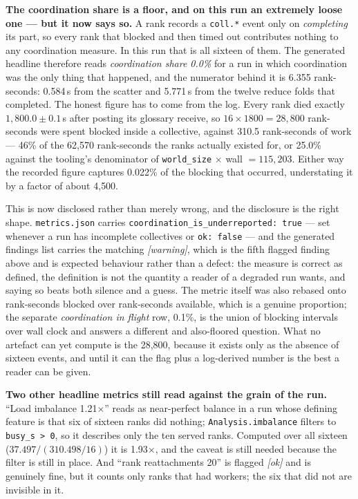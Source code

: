 \documentclass[11pt]{article}
\begin{document}
\textbf{The coordination share is a floor, and on this run an extremely loose one --- but
it now says so.} A rank records a \texttt{coll.*} event only on \emph{completing} its part,
so every rank that blocked and then timed out contributes nothing to any coordination
measure. In this run that is all sixteen of them. The generated headline therefore reads
\emph{coordination share 0.0\%} for a run in which coordination was the only thing that
happened, and the numerator behind it is 6.355 rank-seconds: 0.584\,s from the scatter and
5.771\,s from the twelve reduce folds that completed. The honest figure has to come from
the log. Every rank died exactly $1{,}800.0 \pm 0.1$\,s after posting its glossary
receive, so $16 \times 1800 = 28{,}800$ rank-seconds were spent blocked inside a
collective, against 310.5 rank-seconds of work --- 46\% of the 62{,}570 rank-seconds the
ranks actually existed for, or 25.0\% against the tooling's denominator of
\texttt{world\_size} $\times$ wall $= 115{,}203$. Either way the recorded figure captures
0.022\% of the blocking that occurred, understating it by a factor of about 4{,}500.

This is now disclosed rather than merely wrong, and the disclosure is the right shape.
\texttt{metrics.json} carries \texttt{coordination\_is\_underreported: true} --- set
whenever a run has incomplete collectives or \texttt{ok: false} --- and the generated
findings list carries the matching \emph{[warning]}, which is the fifth flagged finding
above and is expected behaviour rather than a defect: the measure is correct as defined,
the definition is not the quantity a reader of a degraded run wants, and saying so beats
both silence and a guess. The metric itself was also rebased onto rank-seconds blocked
over rank-seconds available, which is a genuine proportion; the separate
\emph{coordination in flight} row, 0.1\%, is the union of blocking intervals over wall
clock and answers a different and also-floored question. What no artefact can yet compute
is the 28{,}800, because it exists only as the absence of sixteen events, and until it can
the flag plus a log-derived number is the best a reader can be given.

\textbf{Two other headline metrics still read against the grain of the run.} ``Load
imbalance 1.21$\times$'' reads as near-perfect balance in a run whose defining feature is
that six of sixteen ranks did nothing; \texttt{Analysis.imbalance} filters to
\texttt{busy\_s > 0}, so it describes only the ten served ranks. Computed over all sixteen
($37.497 / (310.498/16)$) it is 1.93$\times$, and the caveat is still needed because the
filter is still in place. And ``rank reattachments 20'' is flagged \emph{[ok]} and is
genuinely fine, but it counts only ranks that had workers; the six that did not are
invisible in it.
\end{document}
